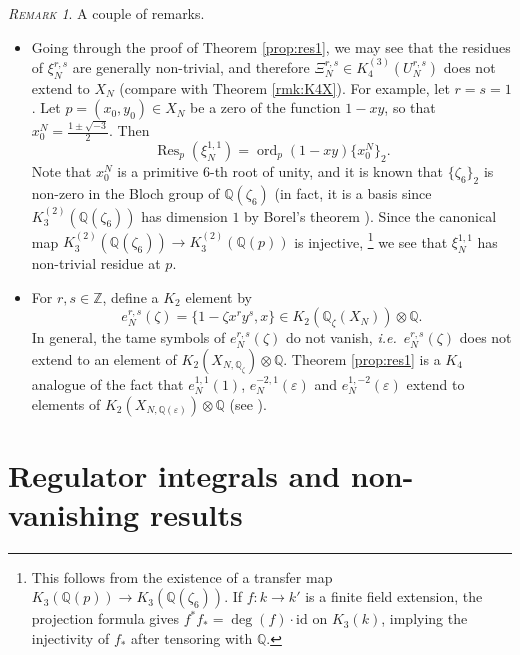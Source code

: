 \documentclass[11pt,a4,leqno]{amsart}
\theoremstyle{my theoremstyle}
\theoremstyle{dfn}
\theoremstyle{remark}
\newtheorem{rmk}[thm]{{\scshape Remark}}
\renewcommand{\1}{\mathbbm{1}}
\newcommand{\Z}{\mathbb{Z}}
\newcommand{\Q}{\mathbb{Q}}
\newcommand{\e}{\varepsilon}
\numberwithin{equation}{section}
\newcommand{\ord}{\operatorname{ord}}
\begin{document}
\begin{rmk} 
A couple of remarks. 
\begin{itemize}
    \item Going through the proof of Theorem \ref{prop:res1}, we may see that the residues of $\xi_N^{r, s}$ are generally non-trivial, and therefore $\Xi_N^{r,s} \in K_4^{(3)}(U_N^{r,s})$  
    does not extend to $X_N$ (compare with Theorem \ref{rmk:K4X}). For example, let $r=s=1$. Let $p=(x_0,y_0) \in X_N$ be a zero of the function $1-xy$, so that $x_0^N=\frac{1 \pm \sqrt{-3}}{2}$. Then
    $$\operatorname{Res}_p(\xi_N^{1,1}) = \ord_{p}(1-xy) \{x_0^N\}_2. $$
    Note that $x_0^N$ is a primitive $6$-th root of unity, and it is known that $\{\zeta_6\}_2$ is non-zero in the Bloch group of $\Q(\zeta_6)$ \cite[Section 9.B]{Zagier} (in fact, it is a basis since $K_3^{(2)}(\Q(\zeta_6))$ has dimension $1$ by Borel's theorem \cite[Theorem IV.1.18]{Wei13}). Since the canonical map $K_3^{(2)}(\Q(\zeta_6)) \to K_3^{(2)}(\Q(p))$ is injective, \footnote{This follows from the existence of a transfer map $K_3(\Q(p)) \to K_3(\Q(\zeta_6))$. If $f : k \to k'$ is a finite field extension, the projection formula \cite[\S 4, (5)]{Qui} gives $f^* f_* = \deg(f) \cdot \mathrm{id}$ on $K_3(k)$, implying the injectivity of $f_*$ after tensoring with $\Q$.} 
we see that $\xi_N^{1,1}$ has non-trivial residue at $p$.
    \item For $r, s \in \Z$, 
define a $K_2$ element by 
$$e_N^{r, s}(\zeta)=\{1-\zeta x^r y^s, x\} \in K_2(\Q_{\zeta} (X_N)) \otimes \Q. $$   
In general, the tame symbols of $e_N^{r, s}(\zeta)$ do not vanish, \emph{i.e.}~$e_N^{r, s}(\zeta)$ does not extend to an element of $K_2(X_{N, \Q_{\zeta}})\otimes \Q$. 
Theorem \ref{prop:res1} is a $K_4$ analogue of the fact that $e_N^{1, 1}(1)$, $e_N^{-2, 1}(\e)$ and $e_N^{1, -2}(\e)$ extend to elements of $K_2(X_{N, \Q(\e)})\otimes \Q$ (see \cite{Ross91}). 
\end{itemize}
\end{rmk}

\section{Regulator integrals and non-vanishing results}\label{sec:asy}
\end{document}
